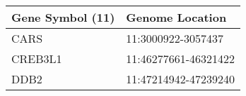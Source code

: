 \begin{tabular}{ll}
\toprule
Gene Symbol (11) &      Genome Location \\
\midrule
            CARS &   11:3000922-3057437 \\
         CREB3L1 & 11:46277661-46321422 \\
            DDB2 & 11:47214942-47239240 \\
\bottomrule
\end{tabular}
